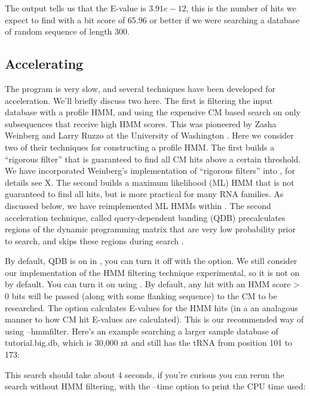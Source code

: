 The output tells us that the E-value is $3.91e-12$, this is the number
of hits we expect to find with a bit score of 65.96 or better if we
were searching a database of random sequence of length 300.

\subsection{Accelerating }
The  program is very slow, and several techniques have
been developed for acceleration. We'll briefly discuss two here. The
first is filtering the input database with a profile HMM, and using
the expensive CM based search on only subsequences that receive high 
HMM scores. This was pioneered by Zasha Weinberg and
Larry Ruzzo at the University of Washington \cite{WeinbergRuzzo05,
  WeinbergRuzzo05b, WeinbergRuzzo06}. Here we consider two of their
techniques for constructing a profile HMM. The first builds a
``rigorous  filter'' that is guaranteed to find all CM hits above a
certain threshold. We have incorporated Weinberg's implementation of
``rigorous filters'' into , for details see X. The
second builds a maximum likelihood (ML) HMM that is not guaranteed to find
all hits, but is more practical for many RNA families. As discussed
below, we have reimplemented ML HMMs within .
The second acceleration technique, called
query-dependent banding (QDB) precalculates
regions of the dynamic programming matrix that are very low
probability prior to search, and skips these regions during search
\cite{NawrockiEddy07}. 

By default, QDB is on in , you can turn it off with the
 option. We still consider our implementation of the HMM
filtering technique experimental, so it is not on by default. You can
turn it on using . By default, any hit with an HMM
score > 0 bits will be passed (along with some flanking sequence) to
the CM to be researched.  The  option calculates E-values
for the HMM hits (in a an analagous manner to how CM hit E-values are
calculated). This is our recommended way of using --hmmfilter. Here's
an example searching a larger sample database of tutorial.big.db,
which is 30,000 nt and still has the tRNA from position 101 to 173:


This search should take about 4 seconds, if you're curious you can
rerun the search without HMM filtering, with the --time option to
print the CPU time used:

